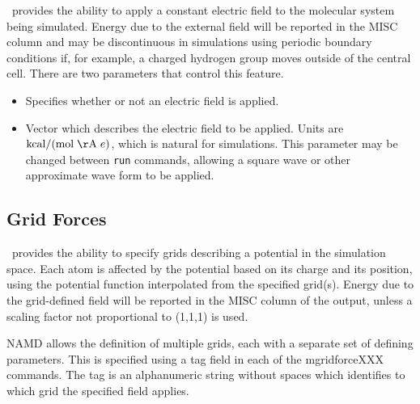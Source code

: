 \NAMD\ provides the ability to apply a constant electric field to the molecular
system being simulated.
Energy due to the external field will be reported in the MISC column
and may be discontinuous in simulations using periodic boundary conditions if,
for example, a charged hydrogen group moves outside of the central cell.
There are two parameters that control this feature.

\begin{itemize}

\item
{}
{Specifies whether or not an electric field is applied.}

\item
{}
{Vector which describes the electric field to be applied.
Units are ${\rm kcal} / ({\rm mol \; \AA} \; e)$, which is natural for simulations.
This parameter may be changed between {\tt run} commands, allowing a square
wave or other approximate wave form to be applied.}

\end{itemize}

\subsection{Grid Forces}

\NAMD\ provides the ability to specify grids describing a potential in the simulation 
space. Each atom is affected by the potential based on its charge and its position, 
using the potential function interpolated from the specified grid(s). Energy due to the 
grid-defined field will be reported in the MISC column of the output, unless a scaling
factor not proportional to (1,1,1) is used.

NAMD allows the definition of multiple grids, each with a separate set of defining 
parameters. This is specified using a tag field in each of the mgridforceXXX commands. 
The tag is an alphanumeric string without spaces which identifies to which grid the 
specified field applies.

